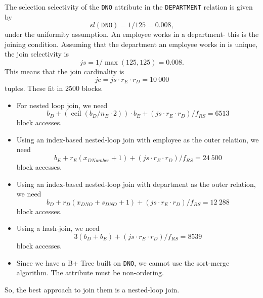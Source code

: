 \documentclass[a4paper, openany]{memoir}
\theoremstyle{definition}
\begin{document}
\begin{answer}
    The selection selectivity of the \texttt{DNO} attribute in the \texttt{DEPARTMENT} relation is given by
    \[\textit{sl}(\texttt{DNO}) = 1/125 = 0.008,\]
    under the uniformity assumption. An employee works in a department- this is the joining condition. Assuming that the department an employee works in is unique, the join selectivity is
    \[\textit{js} = 1/\max(125, 125) = 0.008.\]
    This means that the join cardinality is
    \[\textit{jc} = \textit{js} \cdot r_E \cdot r_D = 10 \ 000\]
    tuples. These fit in $2500$ blocks.
    \begin{itemize}
        \item For nested loop join, we need
        \[b_D + (\operatorname{ceil}(b_D / n_B \cdot 2)) \cdot b_E + (\textit{js} \cdot r_E \cdot r_D)/f_{RS} = 6513\]
        block accesses.
        \item Using an index-based nested-loop join with employee as the outer relation, we need
        \[b_E + r_E (x_{DNumber} + 1) + (\textit{js} \cdot r_E \cdot r_D)/f_{RS} = 24 \ 500\]
        block accesses.
        \item Using an index-based nested-loop join with department as the outer relation, we need
        \[b_D + r_D (x_{DNO} + s_{DNO} + 1) + (\textit{js} \cdot r_E \cdot r_D)/f_{RS} = 12 \ 288\]
        block accesses.
        \item Using a hash-join, we need
        \[3(b_D + b_E) + (\textit{js} \cdot r_E \cdot r_D)/f_{RS} = 8539\]
        block accesses.
        \item Since we have a B+ Tree built on \texttt{DNO}, we cannot use the sort-merge algorithm. The attribute must be non-ordering.
    \end{itemize}
    So, the best approach to join them is a nested-loop join.
\end{answer}
\newpage
\end{document}
